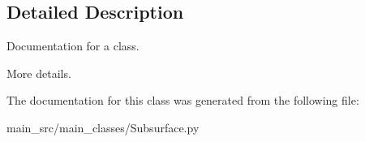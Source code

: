 \subsection{Detailed Description}
Documentation for a class. 

More details. 

The documentation for this class was generated from the following file\-:\begin{DoxyCompactItemize}
\item 
main\-\_\-src/main\-\_\-classes/Subsurface.\-py\end{DoxyCompactItemize}
